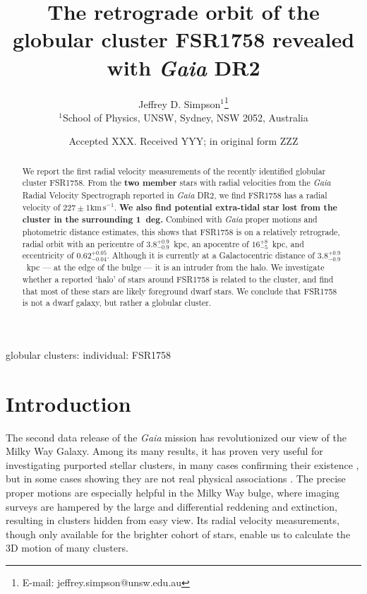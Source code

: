 \documentclass[fleqn,usenatbib]{mnras}
\title[The orbit of FSR1758]{The retrograde orbit of the globular cluster FSR1758 revealed with \textit{Gaia} DR2}
\author[Simpson]{
Jeffrey D. Simpson$^{1}$\thanks{E-mail: jeffrey.simpson@unsw.edu.au}
\\
$^{1}$School of Physics, UNSW, Sydney, NSW 2052, Australia
}
\date{Accepted XXX. Received YYY; in original form ZZZ}
\newcommand{\kms}{\ensuremath{\textrm{km}\,\textrm{s}^{-1}}}
\begin{document}
\label{firstpage}
\pagerange{\pageref{firstpage}--\pageref{lastpage}}
\maketitle

\begin{abstract}
We report the first radial velocity measurements of the recently identified globular cluster FSR1758. From the \textbf{two member} stars with radial velocities from the \textit{Gaia} Radial Velocity Spectrograph reported in \textit{Gaia} DR2, we find FSR1758 has a radial velocity of $227\pm1$\kms. \textbf{We also find potential extra-tidal star lost from the cluster in the surrounding 1~deg.} Combined with \textit{Gaia} proper motions and photometric distance estimates, this shows that FSR1758 is on a relatively retrograde, radial orbit with an pericentre of $3.8_{-0.9}^{+0.9}$~kpc, an apocentre of $16_{-5}^{+8}$~kpc, and eccentricity of $0.62_{-0.04}^{+0.05}$. Although it is currently at a Galactocentric distance of $3.8_{-0.9}^{+0.9}$~kpc --- at the edge of the bulge --- it is an intruder from the halo. We investigate whether a reported `halo' of stars around FSR1758 is related to the cluster, and find that most of these stars are likely foreground dwarf stars. We conclude that FSR1758 is not a dwarf galaxy, but rather a globular cluster.
\end{abstract}

\begin{keywords}
globular clusters: individual: FSR1758
\end{keywords}



\section{Introduction} \label{sec:intro}
The second data release of the \textit{Gaia} mission \citep{GaiaCollaboration:2016cu,GaiaCollaboration:2018io} has revolutionized our view of the Milky Way Galaxy. Among its many results, it has proven very useful for investigating purported stellar clusters, in many cases confirming their existence \citep[e.g.,][]{Simpson:2017ex,Soubiran2018,Cantat-Gaudin2018}, but in some cases showing they are not real physical associations \citep[e.g.,][]{Kos:2018we}. The precise proper motions are especially helpful in the Milky Way bulge, where imaging surveys are hampered by the large and differential reddening and extinction, resulting in clusters hidden from easy view. Its radial velocity measurements, though only available for the brighter cohort of stars, enable us to calculate the 3D motion of many clusters.
\end{document}
